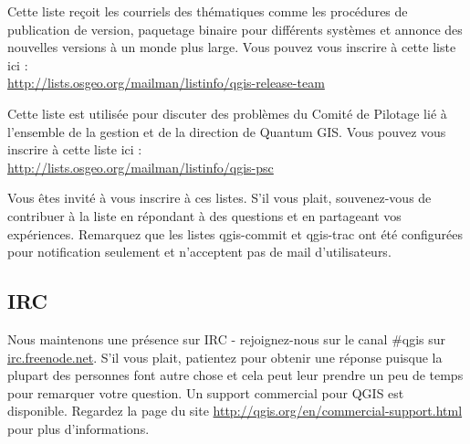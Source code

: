 Cette liste reçoit les courriels des thématiques comme les procédures de
publication de version, paquetage binaire pour différents systèmes et annonce
des nouvelles versions à un monde plus large. Vous pouvez vous inscrire à cette
liste ici :\\
\url{http://lists.osgeo.org/mailman/listinfo/qgis-release-team}

Cette liste est utilisée pour discuter des problèmes du Comité de Pilotage lié à
l'ensemble de la gestion et de la direction de Quantum GIS. Vous pouvez vous
inscrire à cette liste ici :\\
\url{http://lists.osgeo.org/mailman/listinfo/qgis-psc}

Vous êtes invité à vous inscrire à ces listes. S'il vous plait, souvenez-vous de
contribuer à la liste en répondant à des questions et en partageant vos
expériences. Remarquez que les listes qgis-commit et qgis-trac ont été
configurées pour notification seulement et n'acceptent pas de mail
d'utilisateurs.

\subsection{IRC}
Nous maintenons une présence sur IRC - rejoignez-nous sur le canal \#qgis sur
\url{irc.freenode.net}. S'il vous plait, patientez pour obtenir une réponse
puisque la plupart des personnes font autre chose et cela peut leur prendre un
peu de temps pour remarquer votre question. Un support commercial pour QGIS est
disponible. Regardez la page du site \url{http://qgis.org/en/commercial-support.html}
pour plus d'informations.

